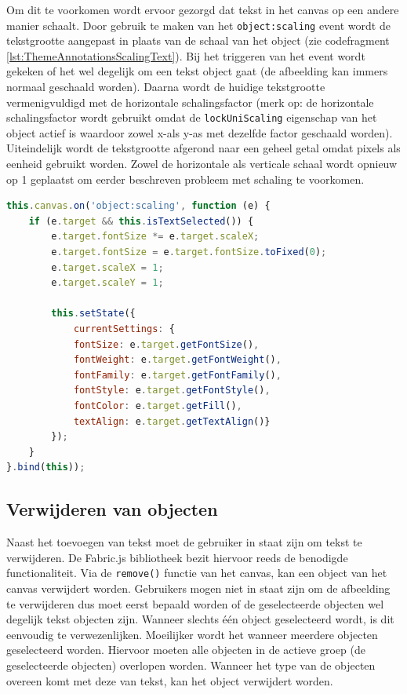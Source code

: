Om dit te voorkomen wordt ervoor gezorgd dat tekst in het canvas op een andere manier schaalt. Door gebruik te maken van het \texttt{object:scaling} event wordt de tekstgrootte aangepast in plaats van de schaal van het object (zie codefragment \ref{lst:ThemeAnnotationsScalingText}). Bij het triggeren van het event wordt gekeken of het wel degelijk om een tekst object gaat (de afbeelding kan immers normaal geschaald worden). Daarna wordt de huidige tekstgrootte vermenigvuldigd met de horizontale schalingsfactor (merk op: de horizontale schalingsfactor wordt gebruikt omdat de \texttt{lockUniScaling} eigenschap van het object actief is waardoor zowel x-als y-as met dezelfde factor geschaald worden). Uiteindelijk wordt de tekstgrootte afgerond naar een geheel getal omdat pixels als eenheid gebruikt worden. Zowel de horizontale als verticale schaal wordt opnieuw op 1 geplaatst om eerder beschreven probleem met schaling te voorkomen. 

\begin{lstlisting}[caption={ThemeAnnotations component - text scaling},label=lst:ThemeAnnotationsScalingText,language=javascript]
this.canvas.on('object:scaling', function (e) {
	if (e.target && this.isTextSelected()) {
		e.target.fontSize *= e.target.scaleX;
		e.target.fontSize = e.target.fontSize.toFixed(0);
		e.target.scaleX = 1;
		e.target.scaleY = 1;
		
		this.setState({
			currentSettings: {
			fontSize: e.target.getFontSize(),
			fontWeight: e.target.getFontWeight(),
			fontFamily: e.target.getFontFamily(),
			fontStyle: e.target.getFontStyle(),
			fontColor: e.target.getFill(),
			textAlign: e.target.getTextAlign()}
		});
	}
}.bind(this));
\end{lstlisting}

\subsection{Verwijderen van objecten}
Naast het toevoegen van tekst moet de gebruiker in staat zijn om tekst te verwijderen. De Fabric.js bibliotheek bezit hiervoor reeds de benodigde functionaliteit. Via de \texttt{remove()} functie van het canvas, kan een object van het canvas verwijdert worden. Gebruikers mogen niet in staat zijn om de afbeelding te verwijderen dus moet eerst bepaald worden of de geselecteerde objecten wel degelijk tekst objecten zijn. Wanneer slechts \'{e}\'{e}n object geselecteerd wordt, is dit eenvoudig te verwezenlijken. Moeilijker wordt het wanneer meerdere objecten geselecteerd worden. Hiervoor moeten alle objecten in de actieve groep (de geselecteerde objecten) overlopen worden. Wanneer het type van de objecten overeen komt met deze van tekst, kan het object verwijdert worden. 

